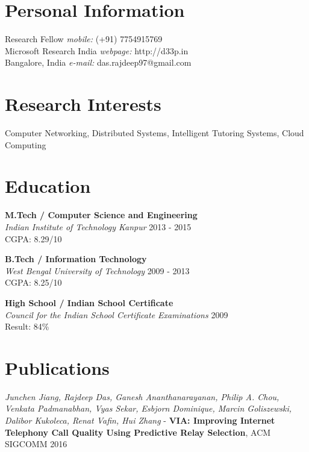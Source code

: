 \documentclass[margin,line]{res}
\begin{document}

\begin{resume}
\section{\sc Personal Information}

Research Fellow            {\hfill {\it mobile:}  (+91) 7754915769} \\       
  Microsoft Research India    {\hfill{\it webpage:} http://d33p.in}
    \\              
Bangalore, India
    {\hfill {\it e-mail:}  das.rajdeep97@gmail.com}\\     



\section{\sc Research Interests}
Computer Networking, Distributed Systems, Intelligent Tutoring Systems, Cloud Computing

\section{\sc Education}

{\bf M.Tech / Computer Science and Engineering} \\
{\em Indian Institute of Technology Kanpur }{\hfill}2013 - 2015 \\
\vspace*{-.1in}
CGPA: 8.29/10
\vspace*{.05in}

{\bf B.Tech / Information Technology} \\
{\em West Bengal University of Technology }{\hfill}2009 - 2013 \\
\vspace*{-.1in}
CGPA: 8.25/10
\vspace*{.05in}

{\bf High School / Indian School Certificate} \\
{\em Council for the Indian School Certificate Examinations }{\hfill}2009 \\
\vspace*{-.1in}
Result: 84\%
\vspace*{.05in}

\section{\sc Publications}
{\em Junchen Jiang, Rajdeep Das, Ganesh Ananthanarayanan, Philip A. Chou, Venkata Padmanabhan, Vyas Sekar, Esbjorn Dominique, Marcin Goliszewski, Dalibor Kukoleca, Renat Vafin, Hui Zhang} - 
{\bf VIA: Improving Internet Telephony Call Quality Using Predictive Relay Selection}, ACM SIGCOMM 2016


\end{resume}
\end{document}
